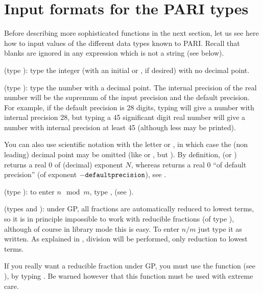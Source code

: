 \section{Input formats for the PARI types}

\noindent
Before describing more sophisticated functions in the next section, let us
see here how to input values of the different data types known to PARI.
Recall that blanks are ignored in any expression which is not a string (see
below).

 
(type ): type the integer (with an initial
\kbd{+} or \kbd{-}, if desired) with no decimal point.

 
(type ): type the number with a decimal
point. The internal precision of the real number will be the supremum of the
input precision and the default precision. For example, if the default
precision is 28 digits, typing  will give a number with internal
precision 28, but typing a 45 significant digit real number will give a
number with internal precision at least 45 (although less may be printed).

You can also use scientific notation with the letter  or
, in which case the (non leading) decimal point may be omitted (like
 or , but  ). By definition,
 (or ) returns a real $0$ of (decimal) exponent
$N$, whereas  returns a real 0 ``of default precision'' (of exponent
$-{\tt defaultprecision}$), see .

(type ): to enter $n \mod m$, type
,   (see ).

(types  and ): under GP, all fractions are
automatically reduced to lowest terms, so it is in principle impossible to
work with reducible fractions (of type ), although of course in
library mode this is easy. To enter $n/m$ just type it as written. As
explained in , division will  be performed, only
reduction to lowest terms.\label{se:FRAC}

If you really want a reducible fraction under GP, you must use the 
function (see ), by typing . Be warned
however that this function must be used with extreme care.

